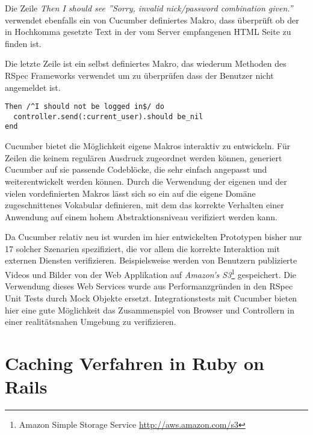 Die Zeile \textit{Then I should see ''Sorry, invalid nick/password
  combination given.''} verwendet ebenfalls ein von Cucumber
definiertes Makro, dass überprüft ob der in Hochkomma gesetzte Text in
der vom Server empfangenen HTML Seite zu finden ist.

Die letzte Zeile ist ein selbst definiertes Makro, das wiederum
Methoden des RSpec Frameworks verwendet um zu überprüfen dass der
Benutzer nicht angemeldet ist.

{\footnotesize
\begin{verbatim}
Then /^I should not be logged in$/ do
  controller.send(:current_user).should be_nil
end
\end{verbatim}
}

Cucumber bietet die Möglichkeit eigene Makros interaktiv zu
entwickeln. Für Zeilen die keinem regulären Ausdruck zugeordnet werden
können, generiert Cucumber auf sie passende Codeblöcke, die sehr
einfach angepasst und weiterentwickelt werden können. Durch die
Verwendung der eigenen und der vielen vordefinierten Makros lässt sich
so ein auf die eigene Domäne zugeschnittenes Vokabular definieren, mit
dem das korrekte Verhalten einer Anwendung auf einem hohem
Abstraktionsniveau verifiziert werden kann.

Da Cucumber relativ neu ist wurden im hier entwickelten Prototypen
bisher nur 17 solcher Szenarien spezifiziert, die vor allem die
korrekte Interaktion mit externen Diensten
verifizieren. Beispielsweise werden von Benutzern publizierte Videos
und Bilder von der Web Applikation auf \textit{Amazon's
  S3}\footnote{Amazon Simple Storage Service
  \url{http://aws.amazon.com/s3}} gespeichert. Die Verwendung dieses
Web Services wurde aus Performanzgründen in den RSpec Unit Tests durch
Mock Objekte ersetzt. Integrationstests mit Cucumber bieten hier eine
gute Möglichkeit das Zusammenspiel von Browser und Controllern in
einer realitätsnahen Umgebung zu verifizieren.

\section{Caching Verfahren in Ruby on Rails}


